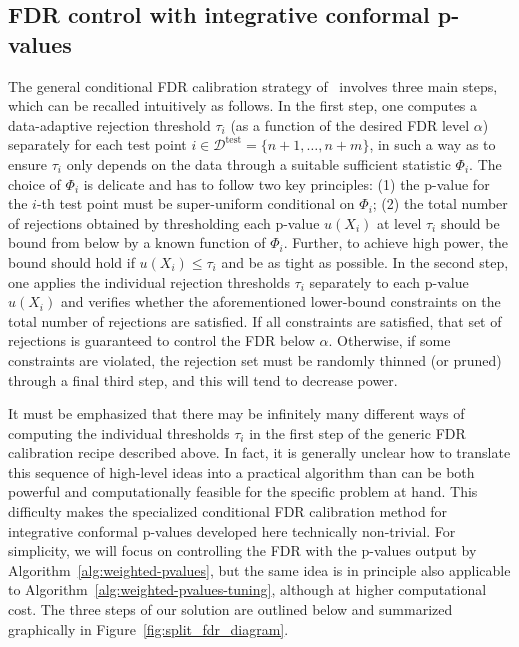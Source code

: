 \documentclass[11pt]{article}
\begin{document}
\subsection{FDR control with integrative conformal p-values} \label{sec:fdr-3steps}

The general conditional FDR calibration strategy of~\cite{2020conditionalcalibration} involves three main steps, which can be recalled intuitively as follows.
In the first step, one computes a data-adaptive rejection threshold $\tau_i$ (as a function of the desired FDR level $\alpha$) separately for each test point $i \in \mathcal{D}^{\mathrm{test}} = \{n+1,\ldots,n+m\}$, in such a way as to ensure $\tau_i$ only depends on the data through a suitable sufficient statistic $\Phi_i$. The choice of  $\Phi_i$ is delicate and has to follow two key principles: (1) the p-value for the $i$-th test point must be super-uniform conditional on $\Phi_i$; (2) the total number of rejections obtained by thresholding each p-value $u(X_i)$ at level $\tau_i$ should be bound from below by a known function of $\Phi_i$. Further, to achieve high power, the bound should hold if $u(X_i) \leq \tau_i$ and be as tight as possible.
In the second step, one applies the individual rejection thresholds $\tau_i$ separately to each p-value $u(X_i)$ and verifies whether the aforementioned lower-bound constraints on the total number of rejections are satisfied.
If all constraints are satisfied, that set of rejections is guaranteed to control the FDR below $\alpha$. Otherwise, if some constraints are violated, the rejection set must be randomly thinned (or pruned) through a final third step, and this will tend to decrease power.

It must be emphasized that there may be infinitely many different ways of computing the individual thresholds $\tau_i$ in the first step of the generic FDR calibration recipe described above. In fact, it is generally unclear how to translate this sequence of high-level ideas into a practical algorithm than can be both powerful and computationally feasible for the specific problem at hand. This difficulty makes the specialized conditional FDR calibration method for integrative conformal p-values developed here  technically non-trivial.
For simplicity, we will focus on controlling the FDR with the p-values output by Algorithm~\ref{alg:weighted-pvalues}, but the same idea is in principle also applicable to Algorithm~\ref{alg:weighted-pvalues-tuning}, although at higher computational cost.
The three steps of our solution are outlined below and summarized graphically in Figure~\ref{fig:split_fdr_diagram}.
\end{document}
